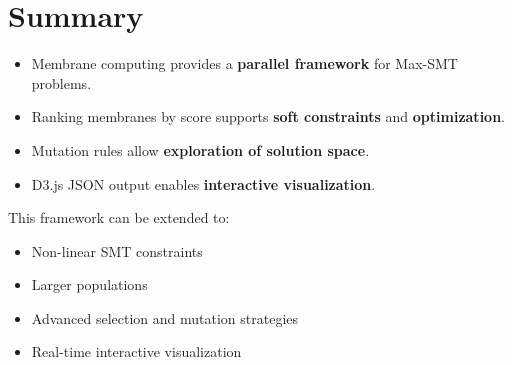 \documentclass[12pt]{article}
\begin{document}
\section{Summary}

\begin{itemize}
    \item Membrane computing provides a \textbf{parallel framework} for Max-SMT problems.
    \item Ranking membranes by score supports \textbf{soft constraints} and \textbf{optimization}.
    \item Mutation rules allow \textbf{exploration of solution space}.
    \item D3.js JSON output enables \textbf{interactive visualization}.
\end{itemize}

This framework can be extended to:
\begin{itemize}
    \item Non-linear SMT constraints
    \item Larger populations
    \item Advanced selection and mutation strategies
    \item Real-time interactive visualization
\end{itemize}
\end{document}
